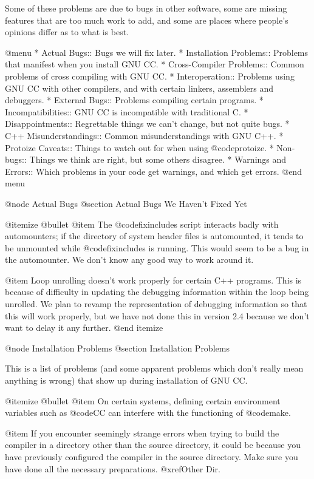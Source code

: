 Some of these problems are due to bugs in other software, some are
missing features that are too much work to add, and some are places
where people's opinions differ as to what is best.

@menu
* Actual Bugs::		      Bugs we will fix later.
* Installation Problems::     Problems that manifest when you install GNU CC.
* Cross-Compiler Problems::   Common problems of cross compiling with GNU CC.
* Interoperation::      Problems using GNU CC with other compilers,
			   and with certain linkers, assemblers and debuggers.
* External Bugs::	Problems compiling certain programs.
* Incompatibilities::   GNU CC is incompatible with traditional C.
* Disappointments::     Regrettable things we can't change, but not quite bugs.
* C++ Misunderstandings::     Common misunderstandings with GNU C++.
* Protoize Caveats::    Things to watch out for when using @code{protoize}.
* Non-bugs::		Things we think are right, but some others disagree.
* Warnings and Errors:: Which problems in your code get warnings,
                         and which get errors.
@end menu

@node Actual Bugs
@section Actual Bugs We Haven't Fixed Yet

@itemize @bullet
@item
The @code{fixincludes} script interacts badly with automounters; if the
directory of system header files is automounted, it tends to be
unmounted while @code{fixincludes} is running.  This would seem to be a
bug in the automounter.  We don't know any good way to work around it.

@item
Loop unrolling doesn't work properly for certain C++ programs.  This is
because of difficulty in updating the debugging information within the
loop being unrolled.  We plan to revamp the representation of debugging
information so that this will work properly, but we have not done this
in version 2.4 because we don't want to delay it any further.
@end itemize

@node Installation Problems
@section Installation Problems

This is a list of problems (and some apparent problems which don't
really mean anything is wrong) that show up during installation of GNU
CC.

@itemize @bullet
@item
On certain systems, defining certain environment variables such as
@code{CC} can interfere with the functioning of @code{make}.

@item
If you encounter seemingly strange errors when trying to build the
compiler in a directory other than the source directory, it could be
because you have previously configured the compiler in the source
directory.  Make sure you have done all the necessary preparations.
@xref{Other Dir}.

